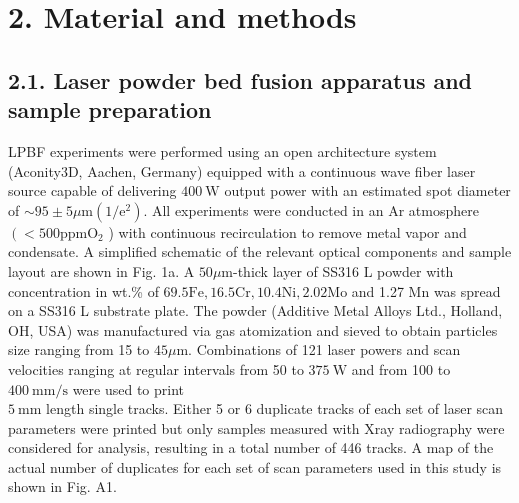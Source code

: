 \documentclass[10pt]{article}
\begin{document}
\section*{2. Material and methods}
\subsection*{2.1. Laser powder bed fusion apparatus and sample preparation}
LPBF experiments were performed using an open architecture system (Aconity3D, Aachen, Germany) equipped with a continuous wave fiber laser source capable of delivering $400 \mathrm{~W}$ output power with an estimated spot diameter of $\sim 95 \pm 5 \mu \mathrm{m}\left(1 / \mathrm{e}^{2}\right)$. All experiments were conducted in an $\mathrm{Ar}$ atmosphere $\left(<500 \mathrm{ppm} \mathrm{O}_{2}\right.$ ) with continuous recirculation to remove metal vapor and condensate. A simplified schematic of the relevant optical components and sample layout are shown in Fig. 1a. A $50 \mu \mathrm{m}$-thick layer of SS316 L powder with concentration in wt.\% of $69.5 \mathrm{Fe}, 16.5 \mathrm{Cr}, 10.4 \mathrm{Ni}, 2.02 \mathrm{Mo}$ and 1.27 Mn was spread on a SS316 L substrate plate. The powder (Additive Metal Alloys Ltd., Holland, OH, USA) was manufactured via gas atomization and sieved to obtain particles size ranging from 15 to $45 \mu \mathrm{m}$. Combinations of 121 laser powers and scan velocities ranging at regular intervals from 50 to $375 \mathrm{~W}$ and from 100 to $400 \mathrm{~mm} / \mathrm{s}$ were used to print\\
$5 \mathrm{~mm}$ length single tracks. Either 5 or 6 duplicate tracks of each set of laser scan parameters were printed but only samples measured with Xray radiography were considered for analysis, resulting in a total number of 446 tracks. A map of the actual number of duplicates for each set of scan parameters used in this study is shown in Fig. A1.
\end{document}
